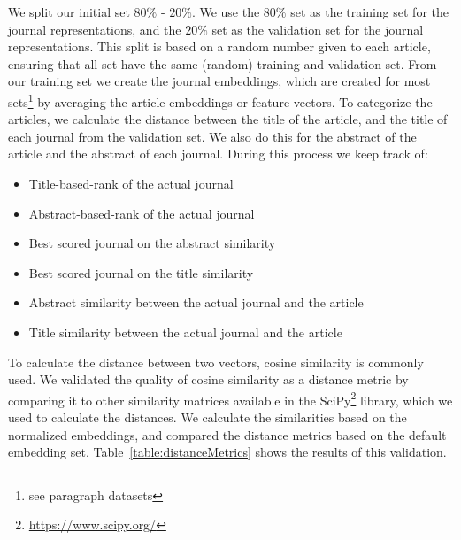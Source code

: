 \documentclass[../../Thesis.tex]{subfiles}
\begin{document}
We split our initial set  $80\%$ - $20\%$. We use the $80\%$ set as the training set for the journal representations, and the $20\%$ set as the validation set for the journal representations. This split is based on a random number given to each article, ensuring that all set have the same (random) training and validation set.
From our training set we create the journal embeddings, which are created for most sets\footnote{see paragraph datasets} by averaging the article embeddings or feature vectors.
To categorize the articles, we calculate the distance between the title of the article, and the title of each journal from the validation set. We also do this for the abstract of the article and the abstract of each journal. During this process we keep track of:
\begin{itemize}
\item{Title-based-rank of the actual journal}
\item{Abstract-based-rank of the actual journal}
\item{Best scored journal on the abstract similarity}
\item{Best scored journal on the title similarity}
\item{Abstract similarity between the actual journal and the article}
\item{Title similarity between the actual journal and the article}
\end{itemize}
To calculate the distance between two vectors, cosine similarity is commonly used. We validated the quality of cosine similarity as a distance metric by comparing it to other similarity matrices available in the SciPy\footnote{\url{https://www.scipy.org/}} library, which we used to calculate the distances. We calculate the similarities based on the normalized embeddings, and compared the distance metrics based on the default embedding set. Table~\ref{table:distanceMetrics} shows the results of this validation.\\
\end{document}
